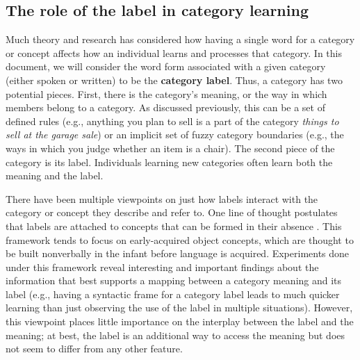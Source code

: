 \documentclass[../dissertation.tex]{subfiles}
\begin{document}
\subsection{The role of the label in category learning}
	Much theory and research has considered how having a single word for a category or concept affects how an individual learns and processes that category. In this document, we will consider the word form associated with a given category (either spoken or written) to be the \textbf{category label}. Thus, a category has two potential pieces. First, there is the category's meaning, or the way in which members belong to a category. As discussed previously, this can be a set of defined rules (e.g., anything you plan to sell is a part of the category \textit{things to sell at the garage sale}) or an implicit set of fuzzy category boundaries (e.g., the ways in which you judge whether an item is a chair). The second piece of the category is its label. Individuals learning new categories often learn both the meaning and the label. \par
	There have been multiple viewpoints on just how labels interact with the category or concept they describe and refer to. One line of thought postulates that labels are attached to concepts that can be formed in their absence \citep{Gillette1999,Snedeker2004}. This framework tends to focus on early-acquired object concepts, which are thought to be built nonverbally in the infant before language is acquired. Experiments done under this framework reveal interesting and important findings about the information that best supports a mapping between a category meaning and its label (e.g., having a syntactic frame for a category label leads to much quicker learning than just observing the use of the label in multiple situations).  However, this viewpoint places little importance on the interplay between the label and the meaning; at best, the label is an additional way to access the meaning but does not seem to differ from any other feature. \par
\end{document}
